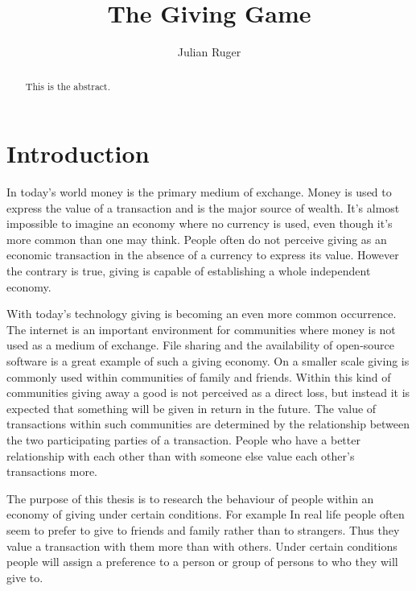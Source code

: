 \documentclass[twoside,openright]{uva-bachelor-thesis}
\title{The Giving Game}
\author{Julian Ruger}
\begin{document}
\maketitle

\begin{abstract}
This is the abstract. 
\end{abstract}

\tableofcontents

\chapter{Introduction}
In today's world money is the primary medium of exchange. Money is used to express the value of a transaction and is the major source of wealth. It's almost impossible to imagine an economy where no currency is used, even though it's more common than one may think. People often do not perceive giving as an economic transaction in the absence of a currency to express its value. However the contrary is true, giving is capable of establishing a whole independent economy. 

With today's technology giving is becoming an even more common occurrence. The internet is an important environment for communities where money is not used as a medium of exchange. File sharing and the availability of open-source software is a great example of such a giving economy. On a smaller scale giving is commonly used within communities of family and friends. Within this kind of communities giving away a good is not perceived as a direct loss, but instead it is expected that something will be given in return in the future. The value of transactions within such communities are determined by the relationship between the two participating parties of a transaction. People who have a better relationship with each other than with someone else value each other’s transactions more. 

The purpose of this thesis is to research the behaviour of people within an economy of giving under certain conditions. For example In real life people often seem to prefer to give to friends and family rather than to strangers. Thus they value a transaction with them more than with others. Under certain conditions people will assign a preference to a person or group of persons to who they will give to. 
\end{document}
